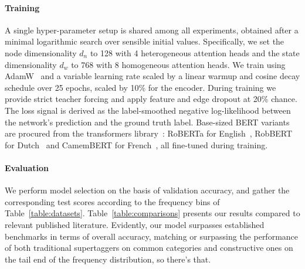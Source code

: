\paragraph{Training}
A single hyper-parameter setup is shared among all experiments, obtained after a minimal logarithmic search over sensible initial values.
Specifically, we set the node dimensionality $d_n$ to 128 with 4 heterogeneous attention heads and the state dimensionality $d_w$ to 768 with 8 homogeneous attention heads.
We train using AdamW~\cite{	loshchilov2018decoupled} and a variable learning rate scaled by a linear warmup and cosine decay schedule over 25 epochs, scaled by 10\% for the encoder.
During training we provide strict teacher forcing and apply feature and edge dropout at 20\% chance.
The loss signal is derived as the label-smoothed negative log-likelihood between the network's prediction and the ground truth label.
Base-sized BERT variants are procured from the transformers library~\cite{wolf2020transformers}: RoBERTa for English~\cite{liu2019roberta}, RobBERT for Dutch~\cite{delobelle2020robbert} and CamemBERT for French~\cite{martin2020camembert}, all fine-tuned during training.

\paragraph{Evaluation}
We perform model selection on the basis of validation accuracy, and gather the corresponding test scores according to the frequency bins of Table~\ref{table:datasets}.
Table~\ref{table:comparisons} presents our results compared to relevant published literature.
Evidently, our model surpasses established benchmarks in terms of overall accuracy, matching or surpassing the performance of both traditional supertaggers on common categories and constructive ones on the tail end of the frequency distribution, so there's that.

